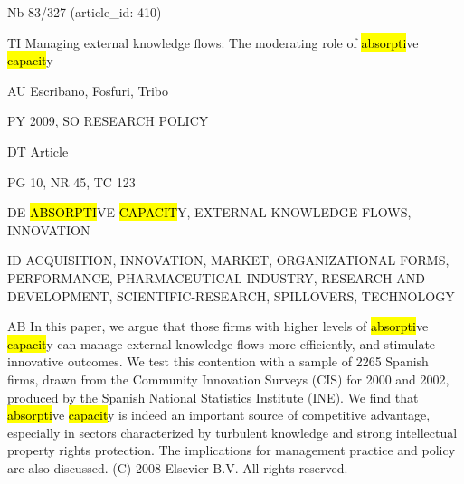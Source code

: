\documentclass[a4paper]{article}
\begin{document}
\vspace*{-2cm}
Nb \tabto{0cm}83/327 (article\_id: 410)\par
TI \tabto{0cm}Managing external knowledge flows: The moderating role of \hl{absorpti}ve \hl{capacit}y\par
AU \tabto{0cm}Escribano, Fosfuri, Tribo\par
PY \tabto{0cm}2009, SO RESEARCH POLICY\par
DT \tabto{0cm}Article\par
PG \tabto{0cm}10, NR 45, TC 123\par
DE \tabto{0cm}\hl{ABSORPTI}VE \hl{CAPACIT}Y, EXTERNAL KNOWLEDGE FLOWS, INNOVATION\par
ID \tabto{0cm}ACQUISITION, INNOVATION, MARKET, ORGANIZATIONAL FORMS, PERFORMANCE, PHARMACEUTICAL-INDUSTRY, RESEARCH-AND-DEVELOPMENT, SCIENTIFIC-RESEARCH, SPILLOVERS, TECHNOLOGY\par
AB \tabto{0cm}In this paper, we argue that those firms with higher levels of \hl{absorpti}ve \hl{capacit}y can manage external knowledge flows more efficiently, and stimulate innovative outcomes. We test this contention with a sample of 2265 Spanish firms, drawn from the Community Innovation Surveys (CIS) for 2000 and 2002, produced by the Spanish National Statistics Institute (INE). We find that \hl{absorpti}ve \hl{capacit}y is indeed an important source of competitive advantage, especially in sectors characterized by turbulent knowledge and strong intellectual property rights protection. The implications for management practice and policy are also discussed. (C) 2008 Elsevier B.V. All rights reserved.\par
\clearpage
\end{document}
